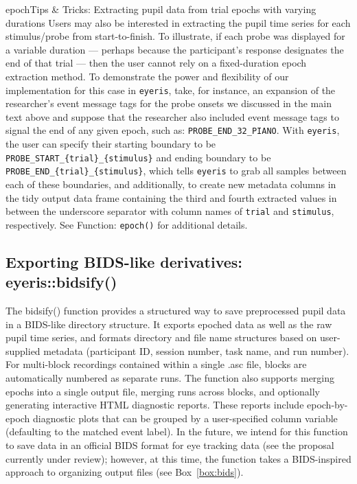 \begin{eyerisbox}{epoch}{Tips \& Tricks: Extracting pupil data from trial epochs with varying durations}
Users may also be interested in extracting the pupil time series for each stimulus/probe from start-to-finish. To illustrate, if each probe was displayed for a variable duration --- perhaps because the participant's response designates the end of that trial --- then the user cannot rely on a fixed-duration epoch extraction method. To demonstrate the power and flexibility of our implementation for this case in \texttt{eyeris}, take, for instance, an expansion of the researcher's event message tags for the probe onsets we discussed in the main text above and suppose that the researcher also included event message tags to signal the end of any given epoch, such as: \texttt{PROBE\_END\_32\_PIANO}. With \texttt{eyeris}, the user can specify their starting boundary to be \texttt{PROBE\_START\_\{trial\}\_\{stimulus\}} and ending boundary to be \texttt{PROBE\_END\_\{trial\}\_\{stimulus\}}, which tells \texttt{eyeris} to grab all samples between each of these boundaries, and additionally, to create new metadata columns in the tidy output data frame containing the third and fourth extracted values in between the underscore separator with column names of \texttt{trial} and \texttt{stimulus}, respectively. See Function: \texttt{epoch()} for additional details.
\end{eyerisbox}

\subsection{Exporting BIDS-like derivatives: eyeris::bidsify()}
The bidsify() function provides a structured way to save preprocessed pupil data in a BIDS-like directory structure. It exports epoched data as well as the raw pupil time series, and formats directory and file name structures based on user-supplied metadata (participant ID, session number, task name, and run number). For multi-block recordings contained within a single .asc file, blocks are automatically numbered as separate runs. The function also supports merging epochs into a single output file, merging runs across blocks, and optionally generating interactive HTML diagnostic reports. These reports include epoch-by-epoch diagnostic plots that can be grouped by a user-specified column variable (defaulting to the matched event label). In the future, we intend for this function to save data in an official BIDS format for eye tracking data (see the proposal currently under review); however, at this time, the function takes a BIDS-inspired approach to organizing output files (see Box~\ref{box:bids}).

